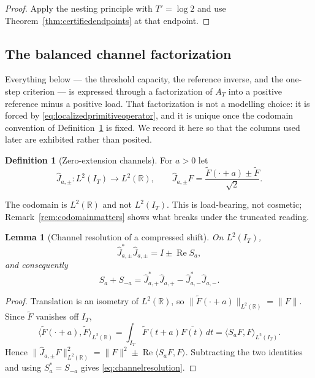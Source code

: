 \documentclass[11pt]{amsart}
\newtheorem{lemma}[theorem]{Lemma}
\theoremstyle{definition}
\newtheorem{definition}[theorem]{Definition}
\theoremstyle{remark}
\newcommand{\R}{\mathbb R}
\begin{document}
\begin{proof}
Apply the nesting principle with \(T'=\log2\) and use
Theorem~\ref{thm:certifiedendpoints} at that endpoint.
\end{proof}

\subsection{The balanced channel factorization}
\label{subsec:balancedchannel}

Everything below --- the threshold capacity, the reference inverse, and the
one-step criterion --- is expressed through a factorization of \(A_T\) into a
positive reference minus a positive load.  That factorization is not a
modelling choice: it is forced by \eqref{eq:localizedprimitiveoperator}, and it
is unique once the codomain convention of Definition~\ref{def:zeroextchannels}
is fixed.  We record it here so that the columns used later are exhibited
rather than posited.

\begin{definition}[Zero-extension channels]\label{def:zeroextchannels}
For \(a>0\) let
\[
 \widehat J_{a,\pm}:L^2(I_T)\longrightarrow L^2(\R),
 \qquad
 \widehat J_{a,\pm}F=\frac{\widetilde F(\cdot+a)\pm\widetilde F}{\sqrt2}.
\]
\end{definition}

The codomain is \(L^2(\R)\) and not \(L^2(I_T)\).  This is load-bearing, not
cosmetic; Remark~\ref{rem:codomainmatters} shows what breaks under the
truncated reading.

\begin{lemma}[Channel resolution of a compressed shift]\label{lem:channelresolution}
On \(L^2(I_T)\),
\[
 \widehat J_{a,\pm}^*\widehat J_{a,\pm}=I\pm\operatorname{Re}S_a ,
\]
and consequently
\begin{equation}\label{eq:channelresolution}
 S_a+S_{-a}
 =\widehat J_{a,+}^*\widehat J_{a,+}-\widehat J_{a,-}^*\widehat J_{a,-}.
\end{equation}
\end{lemma}

\begin{proof}
Translation is an isometry of \(L^2(\R)\), so
\(\|\widetilde F(\cdot+a)\|_{L^2(\R)}=\|F\|\).  Since \(\widetilde F\)
vanishes off \(I_T\),
\[
 \langle\widetilde F(\cdot+a),\widetilde F\rangle_{L^2(\R)}
 =\int_{I_T}\widetilde F(t+a)\overline{F(t)}\,dt
 =\langle S_aF,F\rangle_{L^2(I_T)} .
\]
Hence
\(\|\widehat J_{a,\pm}F\|_{L^2(\R)}^2
 =\|F\|^2\pm\operatorname{Re}\langle S_aF,F\rangle\).
Subtracting the two identities and using \(S_a^*=S_{-a}\) gives
\eqref{eq:channelresolution}.
\end{proof}
\end{document}

